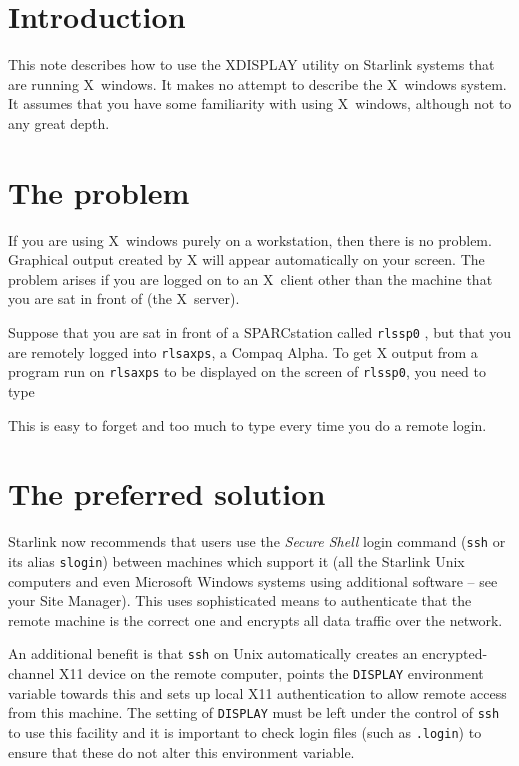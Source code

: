 \documentclass[twoside,11pt,nolof,noabs]{starlink}
\begin{document}
\scfrontmatter


\section{\label{intro}Introduction}

This note describes how to use the XDISPLAY utility on Starlink systems
that are running X~windows.  It makes no attempt to describe the
X~windows system.  It assumes that you have some familiarity with using
X~windows, although not to any great depth.

\section{\label{problem}The problem}

If you are using X~windows purely on a workstation, then there is no
problem.  Graphical output created by X will appear automatically on
your screen.  The problem arises if you are logged on to an X~client
other than the machine that you are sat in front of (the X~server).

Suppose that you are sat in front of a SPARCstation called \texttt{rlssp0}
, but that you are remotely logged into \texttt{rlsaxps}, a Compaq
Alpha.  To get X output from a program run on \texttt{rlsaxps} to be
displayed on the screen of \texttt{rlssp0}, you need to type

\begin{terminalv}
\end{terminalv}

This is easy to forget and too much to type every time you do a remote
login.

\section{\label{ssh} The preferred solution}

Starlink now recommends that users use the \textit{Secure Shell} login
command (\texttt{ssh} or its alias \texttt{slogin}) between machines which
support it (all the Starlink Unix computers and even Microsoft Windows
systems using additional software -- see your Site Manager). This uses
sophisticated means to authenticate that the remote machine is the
correct one and encrypts all data traffic over the network.

An additional benefit is that \texttt{ssh} on Unix automatically creates
an encrypted-channel X11 device on the remote computer, points the
\texttt{DISPLAY} environment variable towards this and sets up local X11
authentication to allow remote access from this machine. The setting of
\texttt{DISPLAY} must be left under the control of \texttt{ssh} to use this
facility and it is important to check login files (such as \texttt{.login})
to ensure that these do not alter this environment variable.
\end{document}
